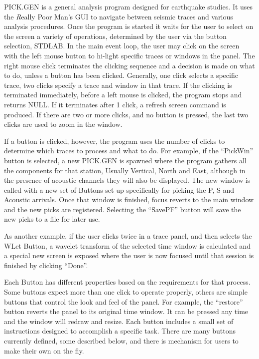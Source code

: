 \documentclass{article}
\begin{document}
PICK.GEN is a general analysis program designed for earthquake studies.
It uses the {\emph Really Poor Man's GUI} to 
navigate between seismic traces and 
various analysis procedures.
Once the program is started it waits for the user to
select on the screen a variety of operations, determined
by the user via the button selection, STDLAB.
In the main event loop, 
the user may click on the screen with the left mouse 
button to hi-light specific traces or windows in the panel.
The right mouse click terminates the clicking sequence and
a decision is made on what to do, unless a button has been clicked.
Generally, one click selects a specific trace,
two clicks specify a trace and window in that trace.
If the clicking is terminated immediately, 
before a left mouse is clicked, the program stops and returns
NULL.
If it terminates after 1 click, a refresh screen 
command is produced. If there are two or more clicks,
and no button is pressed, the last two clicks are
used to zoom in the window.

If a button is clicked, however, 
the program
uses the number of clicks to determine
which traces to process and what to do.
For example, if the ``PickWin'' button is selected,
a new PICK.GEN is spawned where the program 
gathers all the components for that station, Usually Vertical, North and East,
although in the presence of acoustic channels they will also be displayed.
The new window is called with a new set of Buttons
set up specifically for picking the P, S and Acoustic arrivals.
Once that window is finished, focus reverts to the main 
window and the new picks are registered.
Selecting the ``SavePF'' button will save the
new picks to a file for later use.

As another example, if the user clicks twice in a trace panel,
and then selects the WLet Button, a wavelet transform
of the selected time window is calculated and 
a special new screen is exposed where the 
user is now focused until that session is finished by
clicking ``Done''.

Each Button has different properties based on the 
requirements for that process.  Some buttons 
expect more than one click to operate properly, others 
are simple buttons that control the look and feel of the 
panel. For example, the ``restore'' button
reverts the panel to its original time window.
It can be pressed any time and the 
window will redraw and resize.
Each button includes a small set of instructions
designed to accomplish a specific task.
There are many buttons currently defined, some described below, and 
there is mechanism for users to  make their own
on the fly.
\end{document}

